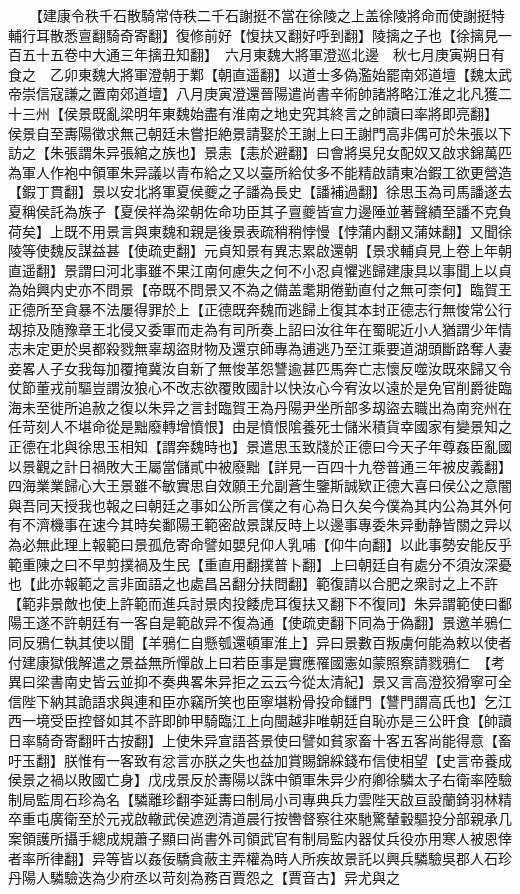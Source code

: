 　　【建康令秩千石散騎常侍秩二千石謝挺不當在徐陵之上盖徐陵將命而使謝挺特輔行耳散悉亶翻騎奇寄翻】復修前好【愎扶又翻好呼到翻】陵摛之子也【徐摛見一百五十五卷中大通三年摛丑知翻】　六月東魏大將軍澄巡北邊　秋七月庚寅朔日有食之　乙卯東魏大將軍澄朝于鄴【朝直遥翻】以道士多偽濫始罷南郊道壇【魏太武帝崇信寇謙之置南郊道壇】八月庚寅澄還晉陽遣尚書辛術帥諸將略江淮之北凡獲二十三州【侯景既亂梁明年東魏始盡有淮南之地史究其終言之帥讀曰率將即亮翻】　侯景自至夀陽徵求無己朝廷未嘗拒絶景請娶於王謝上曰王謝門高非偶可於朱張以下訪之【朱張謂朱异張綰之族也】景恚【恚於避翻】曰會將吳兒女配奴又啟求錦萬匹為軍人作袍中領軍朱异議以青布給之又以臺所給仗多不能精啟請東冶鍜工欲更營造【鍜丁貫翻】景以安北將軍夏侯夔之子譒為長史【譒補過翻】徐思玉為司馬譒遂去夏稱侯託為族子【夏侯祥為梁朝佐命功臣其子亶夔皆宣力邊陲並著聲績至譒不克負荷矣】上既不用景言與東魏和親是後景表疏稍稍悖慢【悖蒲内翻又蒲妹翻】又聞徐陵等使魏反謀益甚【使疏吏翻】元貞知景有異志累啟還朝【景求輔貞見上卷上年朝直遥翻】景謂曰河北事雖不果江南何慮失之何不小忍貞懼逃歸建康具以事聞上以貞為始興内史亦不問景【帝既不問景又不為之備盖耄期倦勤直付之無可柰何】臨賀王正德所至貪暴不法屢得罪於上【正德既奔魏而逃歸上復其本封正德志行無悛常公行刼掠及随豫章王北侵又委軍而走為有司所奏上詔曰汝往年在蜀昵近小人猶謂少年情志未定更於吳都殺戮無辜刼盜財物及還京師專為逋逃乃至江乘要道湖頭斷路奪人妻妾畧人子女我每加覆掩冀汝自新了無悛革怨讐逾甚匹馬奔亡志懷反噬汝既來歸又令仗節董戎前驅豈謂汝狼心不改志欲覆敗國計以快汝心今宥汝以遠於是免官削爵徙臨海未至徙所追赦之復以朱异之言封臨賀王為丹陽尹坐所部多刼盜去職出為南兖州在任苛刻人不堪命從是黜廢轉增憤恨】由是憤恨隂養死士儲米積貨幸國家有變景知之正德在北與徐思玉相知【謂奔魏時也】景遣思玉致牋於正德曰今天子年尊姦臣亂國以景觀之計日禍敗大王屬當儲貳中被廢黜【詳見一百四十九卷普通三年被皮義翻】四海業業歸心大王景雖不敏實思自效願王允副蒼生鑒斯誠欵正德大喜曰侯公之意闇與吾同天授我也報之曰朝廷之事如公所言僕之有心為日久矣今僕為其内公為其外何有不濟機事在速今其時矣鄱陽王範密啟景謀反時上以邊事專委朱异動静皆關之异以為必無此理上報範曰景孤危寄命譬如嬰兒仰人乳哺【仰牛向翻】以此事勢安能反乎範重陳之曰不早剪撲禍及生民【重直用翻撲普卜翻】上曰朝廷自有處分不須汝深憂也【此亦報範之言非面語之也處昌呂翻分扶問翻】範復請以合肥之衆討之上不許【範非景敵也使上許範而進兵討景肉投餧虎耳復扶又翻下不復同】朱异謂範使曰鄱陽王遂不許朝廷有一客自是範啟异不復為通【使疏吏翻下同為于偽翻】景邀羊鴉仁同反鴉仁執其使以聞【羊鴉仁自懸瓠還頓軍淮上】异曰景數百叛虜何能為敕以使者付建康獄俄解遣之景益無所憚啟上曰若臣事是實應罹國憲如蒙照察請戮鴉仁　【考異曰梁書南史皆云並抑不奏典畧朱异拒之云云今從太清紀】景又言高澄狡猾寧可全信陛下納其詭語求與連和臣亦竊所笑也臣寧堪粉骨投命讎門【讐門謂高氏也】乞江西一境受臣控督如其不許即帥甲騎臨江上向閩越非唯朝廷自恥亦是三公旰食【帥讀日率騎奇寄翻旰古按翻】上使朱异宣語荅景使曰譬如貧家畜十客五客尚能得意【畜吁玉翻】朕惟有一客致有忿言亦朕之失也益加賞賜錦綵錢布信使相望【史言帝養成侯景之禍以敗國亡身】戊戌景反於夀陽以誅中領軍朱异少府卿徐驎太子右衛率陸驗制局監周石珍為名【驎離珍翻李延夀曰制局小司專典兵力雲陛天啟亘設蘭錡羽林精卒重屯廣衛至於元戎啟轍武侯遮迾清道晨行按轡督察往來馳驚輦轂驅投分部親承几案領護所攝手總成規蕭子顯曰尚書外司領武官有制局監内器仗兵役亦用寒人被恩倖者率所律翻】异等皆以姦佞驕貪蔽主弄權為時人所疾故景託以興兵驎驗吳郡人石珍丹陽人驎驗迭為少府丞以苛刻為務百賈怨之【賈音古】异尤與之